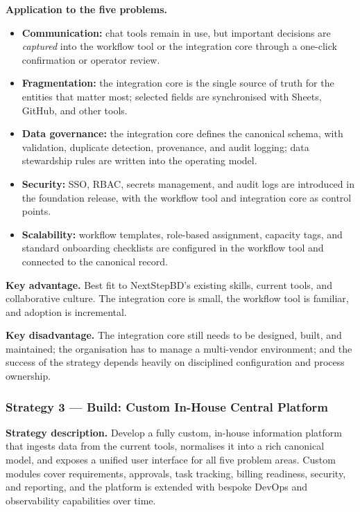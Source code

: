 \documentclass[12pt,a4paper]{report}
\begin{document}
\textbf{Application to the five problems.}
\begin{itemize}[leftmargin=1.6em]
    \item \textbf{Communication:} chat tools remain in use, but important decisions are
          \emph{captured} into the workflow tool or the integration core through a one-click
          confirmation or operator review.
    \item \textbf{Fragmentation:} the integration core is the single source of truth for the
          entities that matter most; selected fields are synchronised with Sheets, GitHub, and
          other tools.
    \item \textbf{Data governance:} the integration core defines the canonical schema, with
          validation, duplicate detection, provenance, and audit logging; data stewardship rules
          are written into the operating model.
    \item \textbf{Security:} SSO, RBAC, secrets management, and audit logs are introduced in
          the foundation release, with the workflow tool and integration core as control
          points.
    \item \textbf{Scalability:} workflow templates, role-based assignment, capacity tags, and
          standard onboarding checklists are configured in the workflow tool and connected to
          the canonical record.
\end{itemize}

\textbf{Key advantage.} Best fit to NextStepBD's existing skills, current tools, and
collaborative culture. The integration core is small, the workflow tool is familiar, and
adoption is incremental.

\textbf{Key disadvantage.} The integration core still needs to be designed, built, and
maintained; the organisation has to manage a multi-vendor environment; and the success of the
strategy depends heavily on disciplined configuration and process ownership.

\subsubsection{Strategy 3 --- Build: Custom In-House Central Platform}
\label{sec:strategy-build}

\textbf{Strategy description.} Develop a fully custom, in-house information platform that
ingests data from the current tools, normalises it into a rich canonical model, and exposes a
unified user interface for all five problem areas. Custom modules cover requirements,
approvals, task tracking, billing readiness, security, and reporting, and the platform is
extended with bespoke DevOps and observability capabilities over time.
\end{document}
